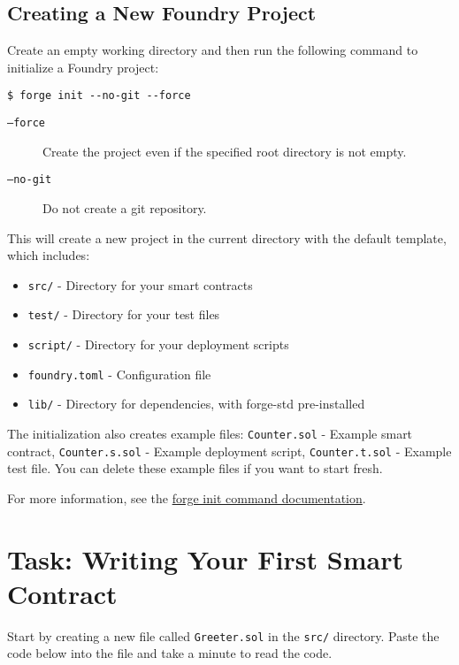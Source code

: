 \documentclass[12pt]{article}
\begin{document}
\subsection{Creating a New Foundry Project}

Create an empty working directory and then run the following command to initialize a Foundry project:

\begin{verbatim}
$ forge init --no-git --force
\end{verbatim}

\begin{description}
    \item[\texttt{--force}] Create the project even if the specified root directory is not empty.
    \item[\texttt{--no-git}] Do not create a git repository.
\end{description}

This will create a new project in the current directory with the default template, which includes:
\begin{itemize}
    \item \texttt{src/} - Directory for your smart contracts
    \item \texttt{test/} - Directory for your test files
    \item \texttt{script/} - Directory for your deployment scripts
    \item \texttt{foundry.toml} - Configuration file
    \item \texttt{lib/} - Directory for dependencies, with forge-std pre-installed
\end{itemize}

\noindent
The initialization also creates example files: \texttt{Counter.sol} - Example smart contract, \texttt{Counter.s.sol} - Example deployment script, \texttt{Counter.t.sol} - Example test file. You can delete these example files if you want to start fresh.

\smallskip
\noindent
For more information, see the \href{https://book.getfoundry.sh/reference/forge/forge-init}{forge init command documentation}.

\section{Task: Writing Your First Smart Contract}

Start by creating a new file called \texttt{Greeter.sol} in the \texttt{src/} directory. Paste the code below into the file and take a minute to read the code.
\end{document}
